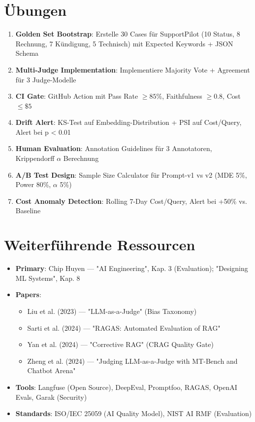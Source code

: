 \section{Übungen}

\begin{enumerate}
    \item \textbf{Golden Set Bootstrap}: Erstelle 30 Cases für SupportPilot (10 Status, 8 Rechnung, 7 Kündigung, 5 Technisch) mit Expected Keywords + JSON Schema
    \item \textbf{Multi-Judge Implementation}: Implementiere Majority Vote + Agreement für 3 Judge-Modelle
    \item \textbf{CI Gate}: GitHub Action mit Pass Rate $\geq 85\%$, Faithfulness $\geq 0.8$, Cost $\leq \$5$
    \item \textbf{Drift Alert}: KS-Test auf Embedding-Distribution + PSI auf Cost/Query, Alert bei p < 0.01
    \item \textbf{Human Evaluation}: Annotation Guidelines für 3 Annotatoren, Krippendorff $\alpha$ Berechnung
    \item \textbf{A/B Test Design}: Sample Size Calculator für Prompt-v1 vs v2 (MDE 5\%, Power 80\%, $\alpha$ 5\%)
    \item \textbf{Cost Anomaly Detection}: Rolling 7-Day Cost/Query, Alert bei +50\% vs. Baseline
\end{enumerate}

\section{Weiterführende Ressourcen}

\begin{itemize}
    \item \textbf{Primary}: Chip Huyen — "AI Engineering", Kap. 3 (Evaluation); "Designing ML Systems", Kap. 8
    \item \textbf{Papers}: 
        \begin{itemize}
            \item Liu et al. (2023) — "LLM-as-a-Judge" (Bias Taxonomy)
            \item Sarti et al. (2024) — "RAGAS: Automated Evaluation of RAG"
            \item Yan et al. (2024) — "Corrective RAG" (CRAG Quality Gate)
            \item Zheng et al. (2024) — "Judging LLM-as-a-Judge with MT-Bench and Chatbot Arena"
        \end{itemize}
    \item \textbf{Tools}: Langfuse (Open Source), DeepEval, Promptfoo, RAGAS, OpenAI Evals, Garak (Security)
    \item \textbf{Standards}: ISO/IEC 25059 (AI Quality Model), NIST AI RMF (Evaluation)
\end{itemize}

